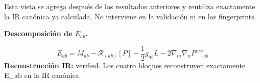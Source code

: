 \documentclass[11pt]{article}
\begin{document}
\par\bigskip{}\par
Esta vista se agrega después de los resultados anteriores y reutiliza exactamente la IR canónica ya calculada. No interviene en la validación ni en los fingerprints.\par
{}
\par\medskip\noindent\textbf{Descomposición de $ E_{ab} $.}\par
\begin{dmath*}[breakdepth={5}]
E_{ab}=M_{ab}-\mathcal{R}_{(ab)}[P]-\frac{1}{2}g_{ab}L-2\nabla_m\nabla_nP^{mn}{}_{ab}
\end{dmath*}
\textbf{Reconstrucción IR:} verified. Los cuatro bloques reconstruyen exactamente E\_ab en la IR canónica.\par
\end{document}
